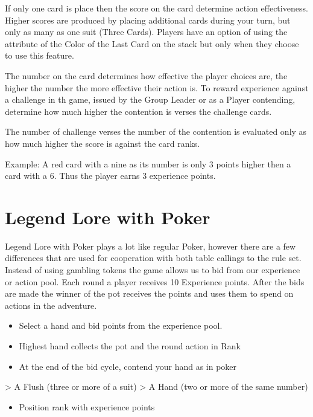 \documentclass{article}
\begin{document}
If only one card is place then the score on the card determine action effectiveness. Higher scores are produced by placing additional cards during your turn, but only as many as one suit (Three Cards). Players have an option of using the attribute of the Color of the Last Card on the stack but only when they choose to use this feature.

The number on the card determines how effective the player choices are, the higher the number the more effective their action is. To reward experience against a challenge in th game, issued by the Group  Leader or as a Player contending, determine how much higher the contention is verses the challenge cards.

The number of challenge verses the number of the contention is evaluated only as how much higher the score is against the card ranks.

Example: A red card with a nine as its number is only 3 points higher then a card with a 6. Thus the player earns 3 experience points.


\section{Legend Lore with Poker}

Legend Lore with Poker plays a lot like regular Poker, however there are a few differences that are used for cooperation with both table callings to the rule set. Instead of using gambling tokens the game allows us to bid from our experience or action pool. Each round a player receives 10 Experience points. After the bids are made the winner of the pot receives the points and uses them to spend on actions in the adventure.

\begin{itemize}
\item  Select a hand and bid points from the experience pool.
\item Highest hand collects the pot and the round action in Rank
\item At the end of the bid cycle, contend your hand as in poker
\end{itemize}

        > A Flush (three or more of a suit)
        > A Hand (two or more of the same number)
        
\begin{itemize}
\item  Position rank with experience points
\end{itemize}
\end{document}
